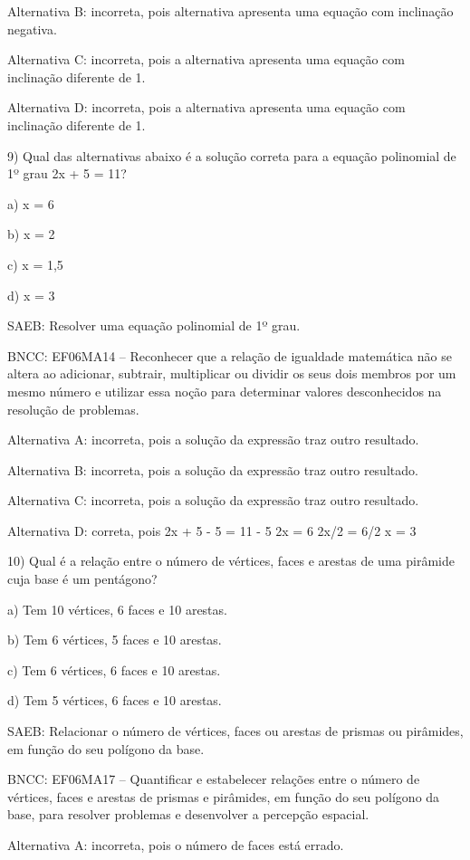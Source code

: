 Alternativa B: incorreta, pois alternativa apresenta uma equação com
inclinação negativa.

Alternativa C: incorreta, pois a alternativa apresenta uma equação com
inclinação diferente de 1.

Alternativa D: incorreta, pois a alternativa apresenta uma equação com
inclinação diferente de 1.

9) Qual das alternativas abaixo é a solução correta para a equação
polinomial de 1º grau 2x + 5 = 11?

a) x = 6

b) x = 2

c) x = 1,5

d) x = 3

SAEB: Resolver uma equação polinomial de 1º grau.

BNCC: EF06MA14 -- Reconhecer que a relação de igualdade matemática não
se altera ao adicionar, subtrair, multiplicar ou dividir os seus dois
membros por um mesmo número e utilizar essa noção para determinar
valores desconhecidos na resolução de problemas.

Alternativa A: incorreta, pois a solução da expressão traz outro
resultado.

Alternativa B: incorreta, pois a solução da expressão traz outro
resultado.

Alternativa C: incorreta, pois a solução da expressão traz outro
resultado.

Alternativa D: correta, pois 2x + 5 - 5 = 11 - 5 2x = 6 2x/2 = 6/2 x = 3

10) Qual é a relação entre o número de vértices, faces e arestas de uma
pirâmide cuja base é um pentágono?

a) Tem 10 vértices, 6 faces e 10 arestas.

b) Tem 6 vértices, 5 faces e 10 arestas.

c) Tem 6 vértices, 6 faces e 10 arestas.

d) Tem 5 vértices, 6 faces e 10 arestas.

SAEB: Relacionar o número de vértices, faces ou arestas de prismas ou
pirâmides, em função do seu polígono da base.

BNCC: EF06MA17 -- Quantificar e estabelecer relações entre o número de
vértices, faces e arestas de prismas e pirâmides, em função do seu
polígono da base, para resolver problemas e desenvolver a percepção
espacial.

Alternativa A: incorreta, pois o número de faces está errado.

